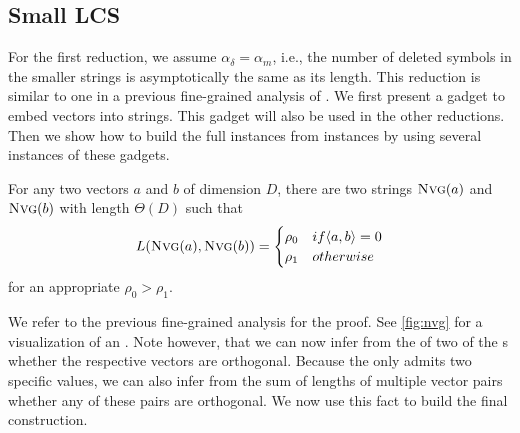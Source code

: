\subsection{Small LCS}
For the first reduction, we assume $\alpha_\delta = \alpha_m$, i.e., the number of deleted symbols in the smaller strings is asymptotically the same as its length.
This reduction is similar to one in a previous fine-grained analysis of \lcs{} \cite{Bringmann.2015}.
We first present a gadget to embed vectors into strings.
This gadget will also be used in the other reductions.
Then we show how to build the full \lcs{} instances from \ov{} instances by using several instances of these gadgets.



\begin{theorem}
\label{thm:nvg}
For any two vectors $a$ and $b$ of dimension $D$, there are two strings $\text{\textsc{Nvg}}(a)$ and $\text{\textsc{Nvg}}(b)$ with length $\Theta(D)$ such that
\[
L(\text{\textsc{Nvg}}(a), \text{\textsc{Nvg}}(b)) = \begin{cases}
		\rho_0 & if \langle a, b \rangle = 0\\
		\rho_1 & otherwise
	\end{cases}
\]
for an appropriate $\rho_0 > \rho_1$.
\end{theorem}



We refer to the previous fine-grained analysis \cite{Bringmann.2015} for the proof.
See \autoref{fig:nvg} for a visualization of an \nvgName{}.
Note however, that we can now infer from the \lcs{} of two of the \nvgName{}s whether the respective vectors are orthogonal.
Because the \lcs{} only admits two specific values, we can also infer from the sum of \lcs{} lengths of multiple vector pairs whether any of these pairs are orthogonal.
We now use this fact to build the final construction.


